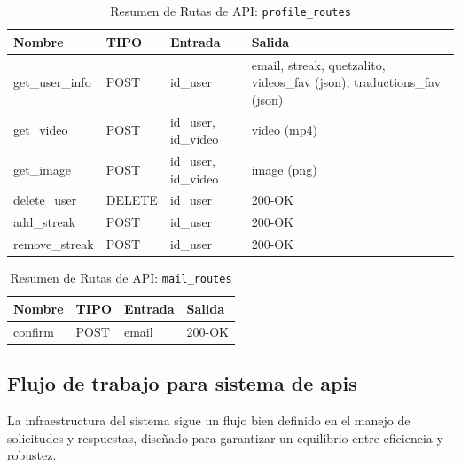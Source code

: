 \begin{table}[H]
\centering
\begin{tabularx}{\textwidth}{|l|l|l|X|}
\hline
\textbf{Nombre} & \textbf{TIPO} & \textbf{Entrada} & \textbf{Salida} \\ \hline
get\_user\_info & POST & id\_user & email, streak, quetzalito, videos\_fav (json), traductions\_fav (json) \\ \hline
get\_video & POST & id\_user, id\_video & video (mp4) \\ \hline
get\_image & POST & id\_user, id\_video & image (png) \\ \hline
delete\_user & DELETE & id\_user & 200-OK \\ \hline
add\_streak & POST & id\_user & 200-OK \\ \hline
remove\_streak & POST & id\_user & 200-OK \\ \hline
\end{tabularx}
\caption{Resumen de Rutas de API: \texttt{profile\_routes}}
\label{tab:profile_routes}
\end{table}

\begin{table}[H]
\centering
\begin{tabularx}{\textwidth}{|l|l|l|X|}
\hline
\textbf{Nombre} & \textbf{TIPO} & \textbf{Entrada} & \textbf{Salida} \\ \hline
confirm & POST & email & 200-OK \\ \hline
\end{tabularx}
\caption{Resumen de Rutas de API: \texttt{mail\_routes}}
\label{tab:mail_routes}
\end{table}



\subsection{Flujo de trabajo para sistema de apis}

La infraestructura del sistema sigue un flujo bien definido en el manejo de solicitudes y respuestas, diseñado para garantizar un equilibrio entre eficiencia y robustez.

